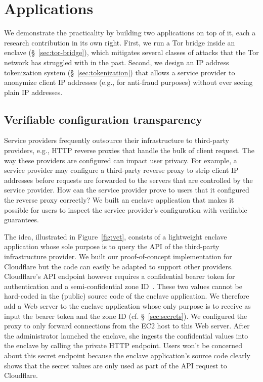\section{Applications}
\label{sec:applications}

We demonstrate the practicality \tool{} by building two applications on top of
it, each a research contribution in its own right.  First, we run a Tor bridge
inside an enclave (\S~\ref{sec:tor-bridge}), which mitigates several classes of
attacks that the Tor network has struggled with in the past.  Second, we design
an IP address tokenization system (\S~\ref{sec:tokenization}) that allows a
service provider to anonymize client IP addresses (e.g., for anti-fraud
purposes) without ever seeing plain IP addresses.

\subsection{Verifiable configuration transparency}
\label{sec:vct}

Service providers frequently outsource their infrastructure to third-party
providers, e.g., HTTP reverse proxies that handle the bulk of client request.
The way these providers are configured can impact user privacy.  For example, a
service provider may configure a third-party reverse proxy to strip client IP
addresses before requests are forwarded to the servers that are controlled by
the service provider.  How can the service provider prove to users that it
configured the reverse proxy correctly?  We built an enclave application that
makes it possible for users to inspect the service provider's configuration with
verifiable guarantees.

The idea, illustrated in Figure~\ref{fig:vct}, consists of a lightweight enclave
application whose sole purpose is to query the API of the third-party
infrastructure provider.  We built our proof-of-concept implementation for
Cloudflare but the code can easily be adapted to support other providers.
Cloudflare's API endpoint however requires a confidential bearer token for
authentication and a semi-confidential zone ID~\cite{spectrum-config}.  These
two values cannot be hard-coded in the (public) source code of the enclave
application.  We therefore add a Web server to the enclave application whose
only purpose is to receive as input the bearer token and the zone ID (cf.
\S~\ref{sec:secrets}).  We configured the proxy to only forward connections from
the EC2 host to this Web server.  After the administrator launched the enclave,
she ingests the confidential values into the enclave by calling the private HTTP
endpoint.  Users won't be concerned about this secret endpoint because the
enclave application's source code clearly shows that the secret values are only
used as part of the API request to Cloudflare.

